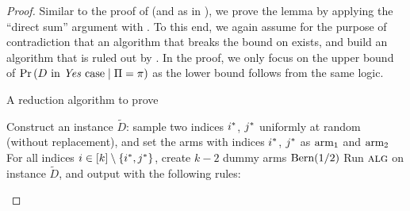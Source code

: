 \begin{proof}
	\FloatBarrier
	Similar to the proof of  (and as in \cite{AW23BestArm}), we prove the lemma by applying the ``direct sum'' argument with . To this end, we again assume for the purpose of contradiction that an algorithm that breaks the bound on  exists, and build an algorithm that is ruled out by . In the proof, we only focus on the upper bound of $\operatorname*{\textnormal{Pr}}\left(\text{$D$ in \emph{Yes} case} \mid \Pi=\pi\right)$ as the lower bound follows from the same logic.
	
	\begin{algorithm}[!h]
		\caption{A reduction algorithm to prove }\label{red:batch-arm-learn}
		Construct an instance $\tilde{D}$: sample two indices $i^{*}$, $j^{*}$ uniformly at random (without replacement), and set the arms with indices $i^{*}$, $j^{*}$ as $\textnormal{arm}_{1}$ and $\textnormal{arm}_{2}$\;
		For all indices $i \in [k]\setminus \{i^{*}, j^{*}\}$, create $k-2$ dummy arms $\textnormal{Bern}(1/2)$\;
		Run $\mbox{\sc alg}$ on instance $\tilde{D}$, and output with the following rules: \;
	\end{algorithm}
	

\end{proof}
